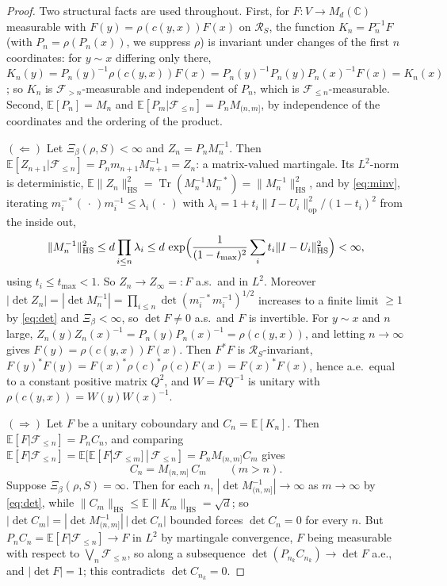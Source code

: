 \documentclass[11pt]{amsart}
\numberwithin{equation}{section}
\theoremstyle{definition}
\theoremstyle{remark}
\newcommand{\C}{\mathbb{C}}
\newcommand{\cF}{\mathcal{F}}
\newcommand{\cR}{\mathcal{R}}
\newcommand{\Tr}{\operatorname{Tr}}
\newcommand{\HS}{\mathrm{HS}}
\newcommand{\E}{\mathbb{E}}
\newcommand{\op}{\mathrm{op}}
\begin{document}
\begin{proof}
Two structural facts are used throughout. First, for $F:V\to M_d(\C)$ measurable with
$F(y)=\rho(c(y,x))F(x)$ on $\cR_S$, the function $K_n=P_n^{-1}F$ (with $P_n=\rho(P_n(x))$, we
suppress $\rho$) is invariant under changes of the first $n$ coordinates: for $y\sim x$
differing only there, $K_n(y)=P_n(y)^{-1}\rho(c(y,x))F(x)=P_n(y)^{-1}P_n(y)P_n(x)^{-1}F(x)=K_n(x)$;
so $K_n$ is $\cF_{>n}$-measurable \cite[Lem.~3.1]{Main} and independent of $P_n$, which is
$\cF_{\le n}$-measurable. Second, $\E[P_n]=M_n$ and $\E[P_m|\cF_{\le n}]=P_nM_{(n,m]}$, by
independence of the coordinates and the ordering of the product.

$(\Leftarrow)$ Let $\Xi_\beta(\rho,S)<\infty$ and $Z_n=P_nM_n^{-1}$. Then
$\E[Z_{n+1}|\cF_{\le n}]=P_nm_{n+1}M_{n+1}^{-1}=Z_n$: a matrix-valued martingale. Its
$L^2$-norm is deterministic, $\E\|Z_n\|_{\HS}^2=\Tr(M_n^{-1}M_n^{-*})=\|M_n^{-1}\|_{\HS}^2$,
and by \eqref{eq:minv}, iterating $m_{i}^{-*}(\,\cdot\,)m_i^{-1}\le\lambda_i(\,\cdot\,)$ with
$\lambda_i=1+t_i\|I-U_i\|_{\op}^2/(1-t_i)^2$ from the inside out,
\[
\|M_n^{-1}\|_{\HS}^2\le d\prod_{i\le n}\lambda_i\le d\,\exp\Bigl(\frac{1}{(1-t_{\max})^2}\sum_it_i\|I-U_i\|_{\HS}^2\Bigr)<\infty ,
\]
using $t_i\le t_{\max}<1$. So $Z_n\to Z_\infty=:F$ a.s.\ and in $L^2$. Moreover
$|\det Z_n|=|\det M_n^{-1}|=\prod_{i\le n}\det(m_i^{-*}m_i^{-1})^{1/2}$ increases to a finite
limit $\ge1$ by \eqref{eq:det} and $\Xi_\beta<\infty$, so $\det F\ne0$ a.s.\ and $F$ is
invertible. For $y\sim x$ and $n$ large, $Z_n(y)Z_n(x)^{-1}=P_n(y)P_n(x)^{-1}=\rho(c(y,x))$, and
letting $n\to\infty$ gives $F(y)=\rho(c(y,x))F(x)$. Then $F^*F$ is $\cR_S$-invariant,
$F(y)^*F(y)=F(x)^*\rho(c)^*\rho(c)F(x)=F(x)^*F(x)$, hence a.e.\ equal to a constant positive
matrix $Q^2$, and $W=FQ^{-1}$ is unitary with $\rho(c(y,x))=W(y)W(x)^{-1}$.

$(\Rightarrow)$ Let $F$ be a unitary coboundary and $C_n=\E[K_n]$. Then
$\E[F|\cF_{\le n}]=P_nC_n$, and comparing $\E[F|\cF_{\le n}]=\E[\E[F|\cF_{\le m}]\,|\,\cF_{\le n}]=P_nM_{(n,m]}C_m$
gives
\begin{equation}\label{eq:consist}
C_n=M_{(n,m]}\,C_m\qquad(m>n).
\end{equation}
Suppose $\Xi_\beta(\rho,S)=\infty$. Then for each $n$, $|\det M_{(n,m]}^{-1}|\to\infty$ as
$m\to\infty$ by \eqref{eq:det}, while $\|C_m\|_{\HS}\le\E\|K_m\|_{\HS}=\sqrt d$; so
$|\det C_m|=|\det M_{(n,m]}^{-1}|\,|\det C_n|$ bounded forces $\det C_n=0$ for every $n$. But
$P_nC_n=\E[F|\cF_{\le n}]\to F$ in $L^2$ by martingale convergence, $F$ being measurable with
respect to $\bigvee_n\cF_{\le n}$, so along a subsequence $\det(P_{n_k}C_{n_k})\to\det F$
a.e., and $|\det F|=1$; this contradicts $\det C_{n_k}=0$.
\end{proof}
\end{document}

